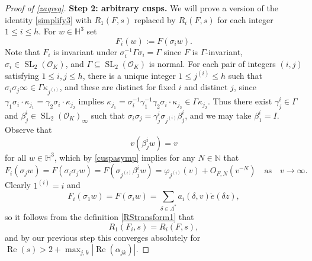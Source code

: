 \documentclass[12pt,reqno]{amsart}
\numberwithin{equation}{section}
\renewcommand{\Re}{\operatorname{Re}}
\DeclareMathOperator{\SL}{SL}
\begin{document}
\begin{proof}[Proof of \cref{zagreg}]
\medskip
\noindent\textbf{Step 2: arbitrary cusps.} We will prove a version of the identity \eqref{simplify3} with $R_{1}(F,s)$ replaced by $R_{i}(F,s)$ for each integer $1\leq i \leq h$. For $w \in \mathbb{H}^3$ set
\begin{equation} \label{fidef}
    F_{i}(w):=F(\sigma_{i} w).
\end{equation}
Note that $F_i$ is invariant under $\sigma_{i}^{-1} \Gamma \sigma_{i} = \Gamma$ since $F$ is $\Gamma$-invariant, $\sigma_i \in \SL_2(\mathcal{O}_K)$, and $\Gamma \subseteq \SL_2(\mathcal{O}_K)$ is normal. For each pair of integers $(i,j)$ satisfying $1\leq i, j \leq h$, there is a unique integer $1\leq j^{(i)} \leq h$ such that $\sigma_i \sigma_j \infty \in \Gamma \kappa_{j^{(i)}}$, and these are distinct for fixed $i$ and distinct $j$, since $\gamma_1 \sigma_i \cdot \kappa_{j_1} = \gamma_2 \sigma_i \cdot \kappa_{j_2}$ implies $\kappa_{j_1} = \sigma_i^{-1} \gamma_1^{-1} \gamma_2 \sigma_i \cdot \kappa_{j_2} \in \Gamma \kappa_{j_2}$. Thus there exist $\gamma_j^i \in \Gamma$ and $\beta_j^i \in \SL_2(\mathcal{O}_K)_{\infty}$ such that $\sigma_i \sigma_j = \gamma_j^i \sigma_{j^{(i)}} \beta_{j}^{i}$, and we may take $\beta_1^i = I$. Observe that
\begin{equation}\label{vbeta}
    v(\beta_j^i w) = v
\end{equation}
for all $w \in \mathbb{H}^3$, which by \eqref{cuspasymp} implies for any $N \in \mathbb{N}$ that
\begin{equation} \label{varphident}
    F_{i}(\sigma_{j} w)= F(\sigma_i \sigma_j w) = F(\sigma_{j^{(i)}} \beta_j^i w) = \varphi_{j^{(i)}}(v)+O_{F,N}(v^{-N}) \quad \text{as} \quad v \to \infty.
\end{equation} 
Clearly $1^{(i)} = i$ and
\begin{equation} \label{fiobs}
    F_{i}(\sigma_1 w)=F(\sigma_{i} w) =  \sum_{\delta \in \Lambda^{*}} a_{i}(\delta,v) \check{e}(\delta z),
\end{equation}
so it follows from the definition \eqref{RStransform1} that
\begin{equation} \label{Rid}
    R_{1}(F_{i},s) = R_{i}(F,s),
\end{equation}
and by our previous step this converges absolutely for $\Re(s)>2+\max_{j, k} \left|\Re(\alpha_{jk})\right|$.


\end{proof}
\end{document}
